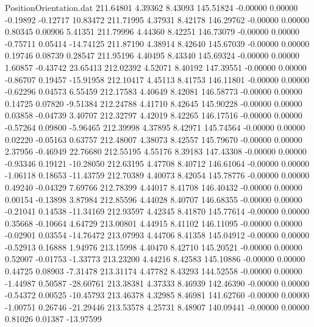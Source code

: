 \begin{filecontents}{PositionOrientation.dat}
 211.64801    4.39362    8.43093   145.51824   -0.00000    0.00000   -0.19892   -0.12717   10.83472
 211.71995    4.37931    8.42178   146.29762   -0.00000    0.00000    0.80345    0.00906    5.41351
 211.79996    4.44360    8.42251   146.73079   -0.00000    0.00000   -0.75711    0.05414  -14.74125
 211.87190    4.38914    8.42640   145.67039   -0.00000    0.00000    0.19746    0.08739    0.28547
 211.95196    4.40495    8.43340   145.69324   -0.00000    0.00000    1.60857   -0.43742   23.65413
 212.02392    4.52071    8.40192   147.39551   -0.00000    0.00000   -0.86707    0.19457  -15.91958
 212.10417    4.45113    8.41753   146.11801   -0.00000    0.00000   -0.62296    0.04573    6.55459
 212.17583    4.40649    8.42081   146.58773   -0.00000    0.00000    0.14725    0.07820   -9.51384
 212.24788    4.41710    8.42645   145.90228   -0.00000    0.00000    0.03858   -0.04739    3.40707
 212.32797    4.42019    8.42265   146.17516   -0.00000    0.00000   -0.57264    0.09800   -5.96465
 212.39998    4.37895    8.42971   145.74564   -0.00000    0.00000    0.02220   -0.05163    0.63757
 212.48007    4.38073    8.42557   145.79670   -0.00000    0.00000    2.37956   -0.46949   22.76680
 212.55195    4.55176    8.39183   147.43308   -0.00000    0.00000   -0.93346    0.19121  -10.28050
 212.63195    4.47708    8.40712   146.61064   -0.00000    0.00000   -1.06118    0.18653  -11.43759
 212.70389    4.40073    8.42054   145.78776   -0.00000    0.00000    0.49240   -0.04329    7.69766
 212.78399    4.44017    8.41708   146.40432   -0.00000    0.00000    0.00154   -0.13898    3.87984
 212.85596    4.44028    8.40707   146.68355   -0.00000    0.00000   -0.21041    0.14538  -11.34169
 212.93597    4.42345    8.41870   145.77614   -0.00000    0.00000    0.35668   -0.10664    4.64729
 213.00801    4.44915    8.41102   146.11095   -0.00000    0.00000   -0.02901    0.03554  -14.76472
 213.07993    4.44706    8.41358   145.04912   -0.00000    0.00000   -0.52913    0.16888    1.94976
 213.15998    4.40470    8.42710   145.20521   -0.00000    0.00000    0.52007   -0.01753   -1.33773
 213.23200    4.44216    8.42583   145.10886   -0.00000    0.00000    0.44725    0.08903   -7.31478
 213.31174    4.47782    8.43293   144.52558   -0.00000    0.00000   -1.44987    0.50587  -28.60761
 213.38381    4.37333    8.46939   142.46390   -0.00000    0.00000   -0.54372    0.00525  -10.45793
 213.46378    4.32985    8.46981   141.62760   -0.00000    0.00000   -1.00751    0.26746  -21.29446
 213.53578    4.25731    8.48907   140.09441   -0.00000    0.00000    0.81026    0.01387  -13.97599

\end{filecontents}
